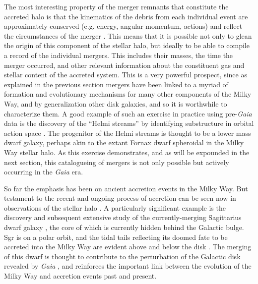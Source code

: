 The most interesting property of the merger remnants that constitute the accreted halo is that the kinematics of the debris from each individual event are approximately conserved (e.g. energy, angular momentum, actions) and reflect the circumstances of the merger \parencite{helmi00,johnston08}. This means that it is possible not only to glean the origin of this component of the stellar halo, but ideally to be able to compile a record of the individual mergers. This includes their masses, the time the merger occurred, and other relevant information about the constituent gas and stellar content of the accreted system. This is a very powerful prospect, since as explained in the previous section mergers have been linked to a myriad of formation and evolutionary mechanisms for many other components of the Milky Way, and by generalization other disk galaxies, and so it is worthwhile to characterize them. A good example of such an exercise in practice using pre-\textit{Gaia} data is the discovery of the ``Helmi streams'' by identifying substructure in orbital action space \parencite{helmi99}. The progenitor of the Helmi streams is thought to be a lower mass dwarf galaxy, perhaps akin to the extant Fornax dwarf spheroidal in the Milky Way stellar halo. As this exercise demonstrates, and as will be expounded in the next section, this catalogueing of mergers is not only possible but actively occurring in the \textit{Gaia} era.

So far the emphasis has been on ancient accretion events in the Milky Way. But testament to the recent and ongoing process of accretion can be seen now in observations of the stellar halo \parencite[e.g.][]{belokurov06}. A particularly significant example is the discovery and subsequent extensive study of the currently-merging Sagittarius dwarf galaxy \parencite[Sgr][]{ibata94}, the core of which is currently hidden behind the Galactic bulge. Sgr is on a polar orbit, and the tidal tails reflecting its doomed fate to be accreted into the Milky Way are evident above and below the disk \parencite{majewski03,belokurov06}. The merging of this dwarf is thought to contribute to the perturbation of the Galactic disk revealed by \textit{Gaia} \parencite[see the previous section][]{antoja18,laporte19}, and reinforces the important link between the evolution of the Milky Way and accretion events past and present.

